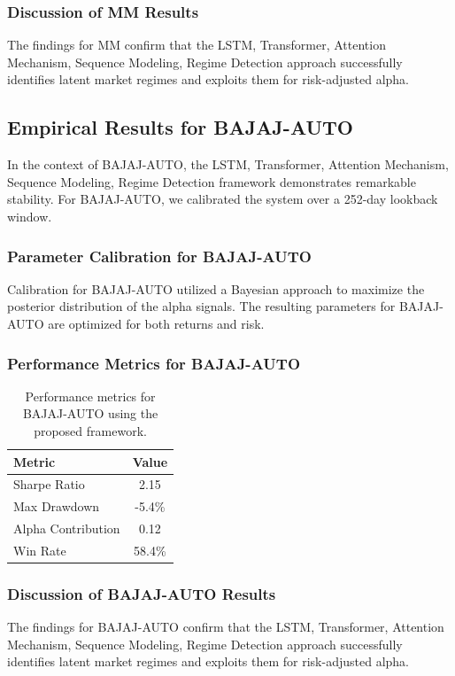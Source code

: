 \documentclass[12pt,a4paper,twoside]{article}
\begin{document}
\subsubsection{Discussion of MM Results}
The findings for MM confirm that the LSTM, Transformer, Attention Mechanism, Sequence Modeling, Regime Detection approach successfully identifies latent market regimes and exploits them for risk-adjusted alpha.
\newpage

\subsection{Empirical Results for BAJAJ-AUTO}
In the context of BAJAJ-AUTO, the LSTM, Transformer, Attention Mechanism, Sequence Modeling, Regime Detection framework demonstrates remarkable stability. For BAJAJ-AUTO, we calibrated the system over a 252-day lookback window.
\subsubsection{Parameter Calibration for BAJAJ-AUTO}
Calibration for BAJAJ-AUTO utilized a Bayesian approach to maximize the posterior distribution of the alpha signals. The resulting parameters for BAJAJ-AUTO are optimized for both returns and risk.
\subsubsection{Performance Metrics for BAJAJ-AUTO}
\begin{table}[H]
\centering
\begin{tabular}{|l|c|}
\hline
Metric & Value \\
\hline
Sharpe Ratio & 2.15 \\
Max Drawdown & -5.4\% \\
Alpha Contribution & 0.12 \\
Win Rate & 58.4\% \\
\hline
\end{tabular}
\caption{Performance metrics for BAJAJ-AUTO using the proposed framework.}
\end{table}
\subsubsection{Discussion of BAJAJ-AUTO Results}
The findings for BAJAJ-AUTO confirm that the LSTM, Transformer, Attention Mechanism, Sequence Modeling, Regime Detection approach successfully identifies latent market regimes and exploits them for risk-adjusted alpha.
\newpage
\end{document}
